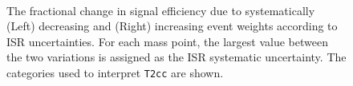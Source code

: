 \begin{figure}[h!]
\begin{center}
{    }  
    \\
    \caption{\label{fig:sms-isr-t2cc}The fractional change in signal
      efficiency due to systematically (Left) decreasing and (Right)
      increasing event weights according to ISR uncertainties. For
      each mass point, the largest value between the two variations is assigned
      as the ISR systematic uncertainty. The categories used to interpret \texttt{T2cc} are shown.}
  \end{center}
\end{figure}


